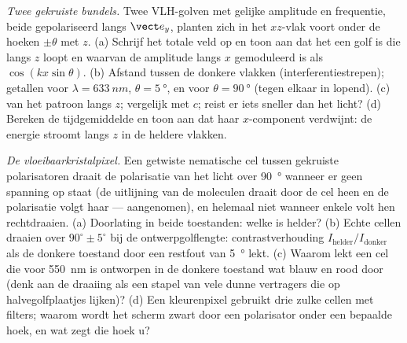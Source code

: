 \begin{exercise}[$\star\star\star$]\label{exo:b2:plane-waves-polarization:10}
\emph{Twee gekruiste bundels.} Twee VLH-golven met gelijke amplitude en
frequentie, beide gepolariseerd langs $\vect e_y$, planten zich in het
$xz$-vlak voort onder de hoeken $\pm\theta$ met $z$. (a) Schrijf het totale
veld op en toon aan dat het een golf is die langs $z$ loopt en waarvan de
amplitude langs $x$ gemoduleerd is als $\cos(kx\sin\theta)$. (b) Afstand
tussen de donkere vlakken (interferentiestrepen); getallen voor
$\lambda = \qty{633}{nm}$, $\theta = \qty{5}{\degree}$, en voor
$\theta = \qty{90}{\degree}$ (tegen elkaar in lopend). (c)  van
het patroon langs $z$; vergelijk met $c$; reist er iets sneller dan het
licht? (d) Bereken de tijdgemiddelde  en toon aan dat haar
$x$-component verdwijnt: de energie stroomt langs $z$ in de heldere vlakken.
\end{exercise}

\begin{exercise}[$\star\star\star$]\label{exo:b2:plane-waves-polarization:11}
\emph{De vloeibaarkristalpixel.} Een getwiste nematische cel tussen
gekruiste polarisatoren draait de polarisatie van het licht over
\qty{90}{\degree} wanneer er geen spanning op staat (de uitlijning van de
moleculen draait door de cel heen en de polarisatie volgt haar ---
aangenomen), en helemaal niet wanneer enkele volt hen rechtdraaien. (a)
Doorlating in beide toestanden: welke is helder? (b) Echte cellen draaien
over $90^\circ \pm 5^\circ$ bij de ontwerpgolflengte: contrastverhouding
$I_{\text{helder}}/I_{\text{donker}}$ als de donkere toestand door een
restfout van \qty{5}{\degree} lekt. (c) Waarom lekt een cel die voor
\qty{550}{nm} is ontworpen in de donkere toestand wat blauw en rood door
(denk aan de draaiing als een stapel van vele dunne vertragers die op
halvegolfplaatjes lijken)? (d) Een kleurenpixel gebruikt drie zulke cellen
met filters; waarom wordt het scherm zwart door een polarisator onder een
bepaalde hoek, en wat zegt die hoek u?
\end{exercise}

